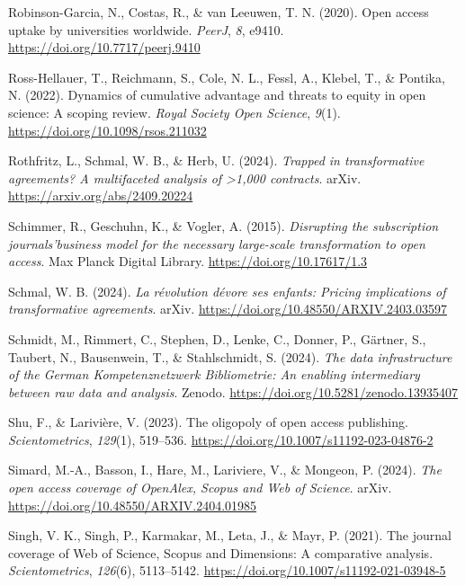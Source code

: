 \documentclass[a4paper,man,floatsintext,longtable,noextraspace,10pt]{apa6}
\newlength{\cslhangindent}
\newenvironment{CSLReferences}[2] %
{\begin{list}{}{%
  \setlength{\itemindent}{0pt}
  \setlength{\leftmargin}{0pt}
  \setlength{\parsep}{0pt}
  \ifodd #1
  \setlength{\leftmargin}{\cslhangindent}
  \setlength{\itemindent}{-1\cslhangindent}
  \fi
  \setlength{\itemsep}{#2\baselineskip}}}
{\end{list}}
\begin{document}
\begin{CSLReferences}{1}{0}
Robinson-Garcia, N., Costas, R., \& van Leeuwen, T. N. (2020). Open
access uptake by universities worldwide. \emph{{PeerJ}}, \emph{8},
e9410. \url{https://doi.org/10.7717/peerj.9410}

Ross-Hellauer, T., Reichmann, S., Cole, N. L., Fessl, A., Klebel, T., \&
Pontika, N. (2022). Dynamics of cumulative advantage and threats to
equity in open science: A scoping review. \emph{Royal Society Open
Science}, \emph{9}(1). \url{https://doi.org/10.1098/rsos.211032}

Rothfritz, L., Schmal, W. B., \& Herb, U. (2024). \emph{Trapped in
transformative agreements? A multifaceted analysis of \textgreater1,000
contracts}. arXiv. \url{https://arxiv.org/abs/2409.20224}

Schimmer, R., Geschuhn, K., \& Vogler, A. (2015). \emph{{Disrupting the
subscription journals'business model for the necessary large-scale
transformation to open access}}. Max Planck Digital Library.
\url{https://doi.org/10.17617/1.3}

Schmal, W. B. (2024). \emph{La révolution dévore ses enfants: Pricing
implications of transformative agreements}. arXiv.
\url{https://doi.org/10.48550/ARXIV.2403.03597}

Schmidt, M., Rimmert, C., Stephen, D., Lenke, C., Donner, P., Gärtner,
S., Taubert, N., Bausenwein, T., \& Stahlschmidt, S. (2024). \emph{The
data infrastructure of the {German Kompetenznetzwerk Bibliometrie}: An
enabling intermediary between raw data and analysis}. Zenodo.
\url{https://doi.org/10.5281/zenodo.13935407}

Shu, F., \& Larivière, V. (2023). The oligopoly of open access
publishing. \emph{Scientometrics}, \emph{129}(1), 519--536.
\url{https://doi.org/10.1007/s11192-023-04876-2}

Simard, M.-A., Basson, I., Hare, M., Lariviere, V., \& Mongeon, P.
(2024). \emph{The open access coverage of {OpenAlex}, {Scopus} and {Web
of Science}}. arXiv. \url{https://doi.org/10.48550/ARXIV.2404.01985}

Singh, V. K., Singh, P., Karmakar, M., Leta, J., \& Mayr, P. (2021). The
journal coverage of {Web of Science}, {Scopus} and {Dimensions}: A
comparative analysis. \emph{Scientometrics}, \emph{126}(6), 5113--5142.
\url{https://doi.org/10.1007/s11192-021-03948-5}


\end{CSLReferences}
\end{document}
